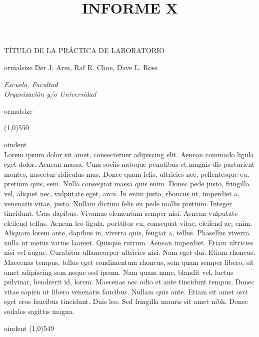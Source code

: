 \documentclass[a4paper,12pt]{article}
\title{INFORME X}
\renewenvironment{abstract}%
 {\par
oindent\textbf{\abstractname}\ \ignorespaces \\}
 {\par
oindent\medskip}
\begin{document}
\begin{center}
\Large{TÍTULO DE LA PRÁCTICA DE LABORATORIO}
\vspace{0.4cm}


ormalsize
Der J. Arm, Raf R. Choe, Dave L. Rose
\vspace{0.1cm}

\textit{\small{Escuela, Facultad }\\
\small{Organización y/o Universidad}}
\medskip


ormalsize

\end{center}
\line(1,0){550}
\begin{abstract}
Lorem ipsum dolor sit amet, consectetuer adipiscing elit. Aenean commodo ligula eget dolor. Aenean massa. Cum sociis natoque penatibus et magnis dis parturient montes, nascetur ridiculus mus. Donec quam felis, ultricies nec, pellentesque eu, pretium quis, sem. Nulla consequat massa quis enim. Donec pede justo, fringilla vel, aliquet nec, vulputate eget, arcu. In enim justo, rhoncus ut, imperdiet a, venenatis vitae, justo. Nullam dictum felis eu pede mollis pretium. Integer tincidunt. Cras dapibus. Vivamus elementum semper nisi. Aenean vulputate eleifend tellus. Aenean leo ligula, porttitor eu, consequat vitae, eleifend ac, enim. Aliquam lorem ante, dapibus in, viverra quis, feugiat a, tellus. Phasellus viverra nulla ut metus varius laoreet. Quisque rutrum. Aenean imperdiet. Etiam ultricies nisi vel augue. Curabitur ullamcorper ultricies nisi. Nam eget dui. Etiam rhoncus. Maecenas tempus, tellus eget condimentum rhoncus, sem quam semper libero, sit amet adipiscing sem neque sed ipsum. Nam quam nunc, blandit vel, luctus pulvinar, hendrerit id, lorem. Maecenas nec odio et ante tincidunt tempus. Donec vitae sapien ut libero venenatis faucibus. Nullam quis ante. Etiam sit amet orci eget eros faucibus tincidunt. Duis leo. Sed fringilla mauris sit amet nibh. Donec sodales sagittis magna.
\end{abstract}
\line(1,0){549}
\medskip
\end{document}
